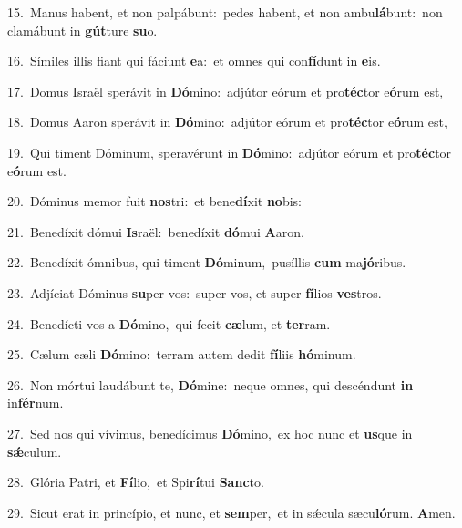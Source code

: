 {\numbfont\textcolor{\numbcolor}{15.}}~Manus habent, et non palpábunt:~\dagger pedes habent, et non ambu\-\textbf{lá}\-bunt:~\star non clamábunt in \textbf{gút}\-ture \textbf{su}\-o.\par
{\numbfont\textcolor{\numbcolor}{16.}}~Símiles illis fiant qui fáciunt \textbf{e}\-a:~\star et omnes qui con\-\textbf{fí}\-dunt in \textbf{e}\-is.\par
{\numbfont\textcolor{\numbcolor}{17.}}~Domus Israël sperávit in \textbf{Dó}\-mino:~\star adjútor eórum et pro\-\textbf{téc}\-tor e\-\textbf{ó}\-rum est,\par
{\numbfont\textcolor{\numbcolor}{18.}}~Domus Aaron sperávit in \textbf{Dó}\-mino:~\star adjútor eórum et pro\-\textbf{téc}\-tor e\-\textbf{ó}\-rum est,\par
{\numbfont\textcolor{\numbcolor}{19.}}~Qui timent Dóminum, speravérunt in \textbf{Dó}\-mino:~\star adjútor eórum et pro\-\textbf{téc}\-tor e\-\textbf{ó}\-rum est.\par
{\numbfont\textcolor{\numbcolor}{20.}}~Dóminus memor fuit \textbf{nos}\-tri:~\star et bene\-\textbf{dí}\-xit \textbf{no}\-bis:\par
{\numbfont\textcolor{\numbcolor}{21.}}~Benedíxit dómui \textbf{Is}\-raël:~\star benedíxit \textbf{dó}\-mui \textbf{A}\-aron.\par
{\numbfont\textcolor{\numbcolor}{22.}}~Benedíxit ómnibus, qui timent \textbf{Dó}\-minum,~\star pusíllis \textbf{cum} ma\-\textbf{jó}\-ribus.\par
{\numbfont\textcolor{\numbcolor}{23.}}~Adjíciat Dóminus \textbf{su}\-per vos:~\star super vos, et super \textbf{fí}\-lios \textbf{ves}\-tros.\par
{\numbfont\textcolor{\numbcolor}{24.}}~Benedícti vos a \textbf{Dó}\-mino,~\star qui fecit \textbf{cæ}\-lum, et \textbf{ter}\-ram.\par
{\numbfont\textcolor{\numbcolor}{25.}}~Cælum cæli \textbf{Dó}\-mino:~\star terram autem dedit \textbf{fí}\-liis \textbf{hó}\-minum.\par
{\numbfont\textcolor{\numbcolor}{26.}}~Non mórtui laudábunt te, \textbf{Dó}\-mine:~\star neque omnes, qui descéndunt \textbf{in} in\-\textbf{fér}\-num.\par
{\numbfont\textcolor{\numbcolor}{27.}}~Sed nos qui vívimus, benedícimus \textbf{Dó}\-mino,~\star ex hoc nunc et \textbf{us}\-que in \textbf{sǽ}\-culum.\par
{\numbfont\textcolor{\numbcolor}{28.}}~Glória Patri, et \textbf{Fí}\-lio,~\star et Spi\-\textbf{rí}\-tui \textbf{Sanc}\-to.\par
{\numbfont\textcolor{\numbcolor}{29.}}~Sicut erat in princípio, et nunc, et \textbf{sem}\-per,~\star et in sǽcula sæcu\-\textbf{ló}\-rum. \textbf{A}\-men.\par

